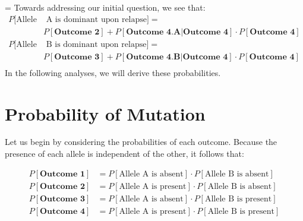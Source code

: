 \documentclass{article}
\begin{document}
\parskip = \baselineskip
Towards addressing our initial question, we see that:
\begin{equation}
\begin{split}
P[\text{Allele} & \text{ A is dominant upon relapse}] = \\ &P[\textbf{Outcome 2}] + P[\textbf{Outcome 4.A}|\textbf{Outcome 4}]\cdot P[\textbf{Outcome 4}] \\
P[\text{Allele} & \text{ B is dominant upon relapse}] = \\ &P[\textbf{Outcome 3}] + P[\textbf{Outcome 4.B}|\textbf{Outcome 4}]\cdot P[\textbf{Outcome 4}] \\
\end{split}
\end{equation}
In the following analyses, we will derive these probabilities.

\section{Probability of Mutation}

Let us begin by considering the probabilities of each outcome.  Because the presence of each allele is independent of the other, it follows that:

\begin{equation}
\begin{split}
P[\textbf{Outcome 1}] & = P[\text{Allele A is absent}] \cdot P[\text{Allele B is absent}] \\
P[\textbf{Outcome 2}] & = P[\text{Allele A is present}] \cdot P[\text{Allele B is absent}] \\
P[\textbf{Outcome 3}] & = P[\text{Allele A is absent}] \cdot P[\text{Allele B is present}] \\
P[\textbf{Outcome 4}] & = P[\text{Allele A is present}] \cdot P[\text{Allele B is present}]
\end{split}
\end{equation}
\end{document}
